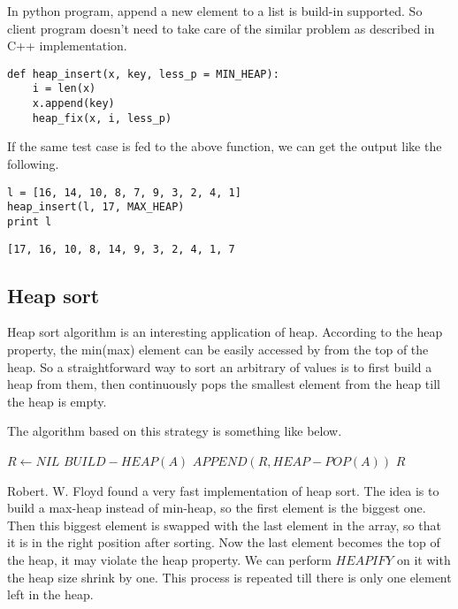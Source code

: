 \documentclass{article}
\begin{document}
In python program, append a new element to a list is build-in
supported. So client program doesn't need to take care of the
similar problem as described in C++ implementation.

\lstset{language=Python}
\begin{lstlisting}
def heap_insert(x, key, less_p = MIN_HEAP):
    i = len(x)
    x.append(key)
    heap_fix(x, i, less_p)
\end{lstlisting}

If the same test case is fed to the above function, we can 
get the output like the following.

\begin{lstlisting}
l = [16, 14, 10, 8, 7, 9, 3, 2, 4, 1]
heap_insert(l, 17, MAX_HEAP)
print l
\end{lstlisting}

\begin{verbatim}
[17, 16, 10, 8, 14, 9, 3, 2, 4, 1, 7
\end{verbatim}

\subsection{Heap sort}
\label{heap-sort}

Heap sort algorithm is an interesting application of heap. According
to the heap property, the min(max) element can be easily accessed
by from the top of the heap. So a straightforward way to sort an
arbitrary of values is to first build a heap from them, then continuously
pops the smallest element from the heap till the heap is empty.

The algorithm based on this strategy is something like below.

\begin{algorithmic}[1]
  \State $R \gets NIL$
  \State $BUILD-HEAP(A)$
    \State $APPEND(R, HEAP-POP(A))$
  \EndWhile
  \State \Return $R$
\EndFunction
\end{algorithmic}

Robert. W. Floyd found a very fast implementation of heap sort.
The idea is to build a max-heap instead of min-heap, so the first
element is the biggest one. Then this biggest element is swapped
with the last element in the array, so that it is in the right
position after sorting. Now the last element becomes the top
of the heap, it may violate the heap property. We can perform
$HEAPIFY$ on it with the heap size shrink by one. This process
is repeated till there is only one element left in the heap.
\end{document}
